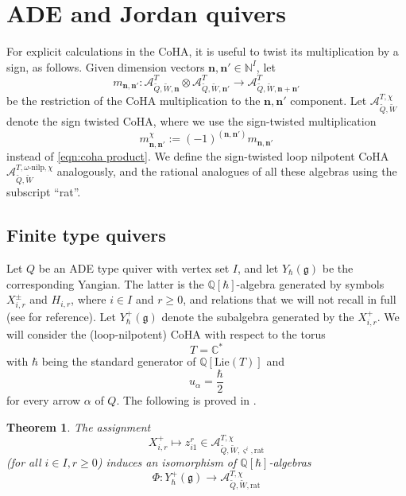 \documentclass{amsart}
\newtheorem{theorem}{Theorem}[section]
\def\fg{{\mathfrak{g}}}
\def\BQ{{\mathbb{Q}}}
\def\CA{{\mathcal{A}}}
\def\bs{\boldsymbol{\varsigma}}
\def\nn{{\mathbb{N}^I}}
\def\bn{{\boldsymbol{n}}}
\def\tQ{\tilde{Q}}
\def\tW{\tilde{W}}
\begin{document}
\bigskip 

\section{ADE and Jordan quivers}
\label{sec:examples}

\medskip 

\noindent For explicit calculations in the CoHA, it is useful to twist its multiplication by a sign, as follows. Given dimension vectors $\bn,\bn' \in \nn$, let 
\begin{equation}
\label{eqn:coha product}
m_{\bn,\bn'} : \CA^T_{\tQ,\tW,\bn} \otimes \CA^T_{\tQ,\tW,\bn'} \rightarrow \CA^T_{\tQ,\tW,\bn+\bn'}
\end{equation}
be the restriction of the CoHA multiplication to the $\bn,\bn'$ component. Let $\mathcal{A}^{T,\chi}_{\tilde{Q},\tilde{W}}$ denote the sign twisted CoHA, where we use the sign-twisted multiplication 
\begin{equation}
\label{eqn:twisted coha product}
m_{\bn,\bn'}^{\chi} := (-1)^{(\bn,\bn')} m_{\bn,\bn'}
\end{equation}
instead of \eqref{eqn:coha product}. We define the sign-twisted loop nilpotent CoHA $\mathcal{A}^{T, \omega\text{-nilp},\chi}_{\tilde{Q},\tilde{W}}$ analogously, and the rational analogues of all these algebras using the subscript ``rat''.

\medskip 

\subsection{Finite type quivers}
\label{sub:ade quiver}

Let $Q$ be an ADE type quiver with vertex set $I$, and let $Y_{\hbar}(\fg)$ be the corresponding Yangian. The latter is the $\mathbb{Q}[\hbar]$-algebra generated by symbols $X^{\pm}_{i,r}$ and $H_{i,r}$, where $i \in I$ and $r \geq 0$, and relations that we will not recall in full (see \cite{CWendl} for reference). Let $Y^+_{\hbar}(\fg)$ denote the subalgebra generated by the $X^+_{i,r}$. We will consider the (loop-nilpotent) CoHA with respect to the torus
$$
T=\mathbb{C}^*
$$
with $\hbar$ being the standard generator of $\BQ[\text{Lie}(T)]$ and
$$
u_\alpha = \frac {\hbar}2
$$
for every arrow $\alpha$ of $Q$. The following is proved in \cite[Theorem D]{Yang_2018}.

\medskip 

\begin{theorem}
The assignment 
$$
X^+_{i,r} \mapsto z^r_{i1} \in \mathcal{A}^{T,\chi}_{\tilde{Q},\tilde{W}, \bs^i, \mathrm{rat}}
$$
(for all $i \in I, r \geq 0$) induces an isomorphism of $\mathbb{Q}[\hbar]$-algebras
\begin{equation}
\label{eqn:phi}
\Phi: Y^+_{\hbar}(\fg) \rightarrow \mathcal{A}^{T,\chi}_{\tilde{Q},\tilde{W},\mathrm{rat}}
\end{equation}
\end{theorem}
\end{document}
